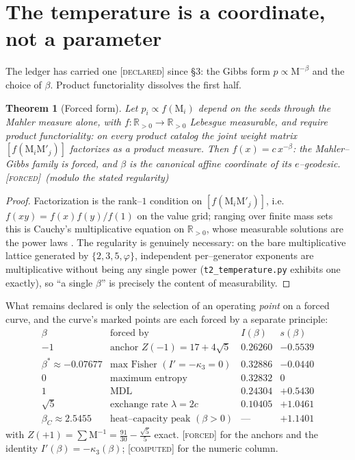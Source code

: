 \documentclass[11pt]{article}
\newtheorem{theorem}{Theorem}[section]
\theoremstyle{definition}
\newcommand{\ph}{\varphi}
\newcommand{\R}{\mathbb{R}}
\newcommand{\Mah}{\mathrm{M}}
\newcommand{\forcedtag}{{\scshape [forced]}}
\newcommand{\declaredtag}{{\scshape [declared]}}
\newcommand{\computedtag}{{\scshape [computed]}}
\begin{document}
\section{The temperature is a coordinate, not a parameter}\label{sec:tempcoord}
The ledger has carried one \declaredtag{} since \S3: the Gibbs form $p\propto\Mah^{-\beta}$ and the
choice of $\beta$. Product functoriality dissolves the first half.

\begin{theorem}[Forced form]\label{thm:forcedform}
Let $p_i\propto f(\Mah_i)$ depend on the seeds through the Mahler measure alone, with
$f:\R_{>0}\to\R_{>0}$ Lebesgue measurable, and require product functoriality: on every product
catalog the joint weight matrix $[f(\Mah_i\Mah'_j)]$ factorizes as a product measure. Then
$f(x)=c\,x^{-\beta}$: the Mahler--Gibbs family is \emph{forced}, and $\beta$ is the canonical affine
coordinate of its $e$--geodesic. \forcedtag\ (modulo the stated regularity)
\end{theorem}
\begin{proof}
Factorization is the rank--$1$ condition on $[f(\Mah_i\Mah'_j)]$, i.e.\ $f(xy)=f(x)f(y)/f(1)$ on the
value grid; ranging over finite mass sets this is Cauchy's multiplicative equation on $\R_{>0}$,
whose measurable solutions are the power laws \cite{aczel}. The regularity is genuinely necessary: on
the bare multiplicative lattice generated by $\{2,3,5,\ph\}$, independent per--generator exponents are
multiplicative without being any single power (\texttt{t2\_temperature.py} exhibits one exactly), so
``a single $\beta$'' is precisely the content of measurability.
\end{proof}

What remains declared is only the selection of an operating \emph{point} on a forced curve, and the
curve's marked points are each forced by a separate principle:
\[
\begin{array}{lllr}
\beta & \text{forced by} & I(\beta) & s(\beta)\\[2pt]
-1 & \text{anchor } Z(-1)=17+4\sqrt5 & 0.26260 & -0.5539\\
\beta^\ast\approx-0.07677 & \text{max Fisher }(I'=-\kappa_3=0) & 0.32886 & -0.0440\\
0 & \text{maximum entropy} & 0.32832 & 0\\
1 & \text{MDL} & 0.24304 & +0.5430\\
\sqrt5 & \text{exchange rate }\lambda=2c & 0.10405 & +1.0461\\
\beta_C\approx2.5455 & \text{heat--capacity peak }(\beta>0) & \text{---} & +1.1401
\end{array}
\]
with $Z(+1)=\sum\Mah^{-1}=\tfrac{91}{30}-\tfrac{\sqrt5}{5}$ exact. \forcedtag{} for the anchors and
the identity $I'(\beta)=-\kappa_3(\beta)$; \computedtag{} for the numeric column.
\end{document}
